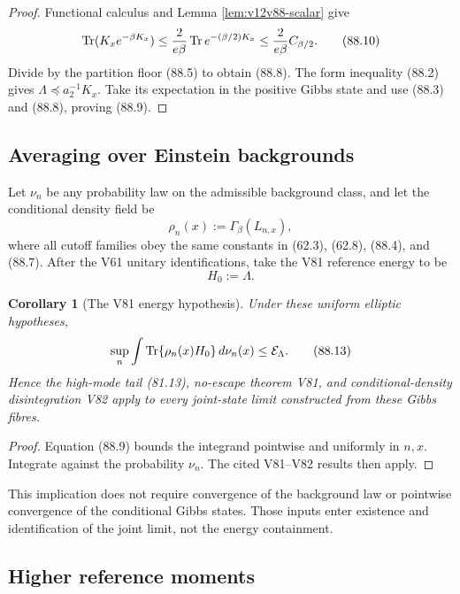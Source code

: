 \documentclass[11pt]{article}
\newtheorem{corollary}[theorem]{Corollary}
\theoremstyle{remark}
\begin{document}
\begin{proof}
Functional calculus and Lemma \ref{lem:v12v88-scalar} give
\[
 \operatorname{Tr}(K_xe^{-\beta K_x})
 \leq {2\over e\beta}
 \operatorname{Tr}e^{-(\beta/2)K_x}
 \leq {2\over e\beta}C_{\beta/2}.                           \tag{88.10}
\]
Divide by the partition floor (88.5) to obtain (88.8).
The form inequality (88.2) gives
\(\Lambda\preceq a_2^{-1}K_x\).  Take its expectation in the
positive Gibbs state and use (88.3) and (88.8), proving (88.9).
\end{proof}

\subsection{Averaging over Einstein backgrounds}

Let \(\nu_n\) be any probability law on the admissible background
class, and let the conditional density field be
\[
                         \rho_n(x):=\Gamma_\beta(L_{n,x}),   \tag{88.11}
\]
where all cutoff families obey the same constants in
(62.3), (62.8), (88.4), and (88.7).  After the V61 unitary
identifications, take the V81 reference energy to be
\[
                              H_0:=\Lambda.                  \tag{88.12}
\]

\begin{corollary}[The V81 energy hypothesis]
\label{cor:v12v88-V81}
Under these uniform elliptic hypotheses,
\begin{equation}
 \sup_n\int
 \operatorname{Tr}\{\rho_n(x)H_0\}\,d\nu_n(x)
 \leq{\cal E}_\Lambda.                                      \tag{88.13}
\end{equation}
Hence the high-mode tail (81.13), no-escape theorem V81, and
conditional-density disintegration V82 apply to every joint-state
limit constructed from these Gibbs fibres.
\end{corollary}

\begin{proof}
Equation (88.9) bounds the integrand pointwise and uniformly in
\(n,x\).  Integrate against the probability \(\nu_n\).  The cited
V81--V82 results then apply.
\end{proof}

This implication does not require convergence of the background law
or pointwise convergence of the conditional Gibbs states.  Those
inputs enter existence and identification of the joint limit, not
the energy containment.

\subsection{Higher reference moments}
\end{document}
